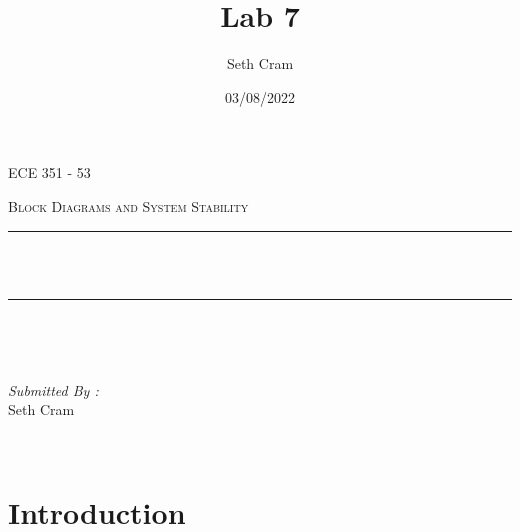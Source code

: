 \documentclass[12pt]{report}
\title{Lab 7}		%
\author{ Seth Cram}
\date{03/08/2022}
\makeatletter
\let\thetitle\@title
\makeatother
\begin{document}

\begin{titlepage}
	\centering
    \vspace*{0.5 cm}
\begin{center}    \textsc{\Large   ECE 351 - 53 }\\[2.0 cm]	\end{center}%
	\textsc{\Large Block Diagrams and System Stability }\\[.5 cm]				%
	\rule{\linewidth}{0.2 mm} \\[0.4 cm]
	{ \huge \bfseries \thetitle}\\
	\rule{\linewidth}{0.2 mm} \\[1.5 cm]
	
	\begin{minipage}{0.4\textwidth}
		\begin{flushleft} \large
			\end{flushleft}
			\end{minipage}~
			\begin{minipage}{0.4\textwidth}
            
			\begin{flushright} \large
			\emph{Submitted By :} \\
			Seth Cram  
		\end{flushright}
           
	\end{minipage}\\[2 cm]
	
\end{titlepage}


\tableofcontents
\pagebreak

\renewcommand{\thesection}{\arabic{section}}

\section{Introduction}
\end{document}
